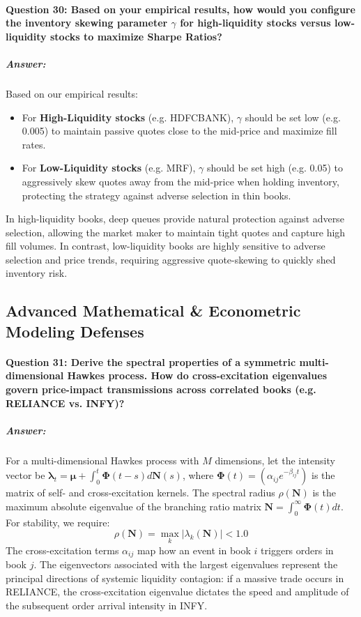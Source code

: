 \documentclass[11pt,a4paper]{article}
\begin{document}
\paragraph{Question 30: Based on your empirical results, how would you configure the inventory skewing parameter $\gamma$ for high-liquidity stocks versus low-liquidity stocks to maximize Sharpe Ratios?}
\subparagraph{Answer:}
Based on our empirical results:
\begin{itemize}
    \item For \textbf{High-Liquidity stocks} (e.g. HDFCBANK), $\gamma$ should be set low (e.g. 0.005) to maintain passive quotes close to the mid-price and maximize fill rates.
    \item For \textbf{Low-Liquidity stocks} (e.g. MRF), $\gamma$ should be set high (e.g. 0.05) to aggressively skew quotes away from the mid-price when holding inventory, protecting the strategy against adverse selection in thin books.
\end{itemize}

In high-liquidity books, deep queues provide natural protection against adverse selection, allowing the market maker to maintain tight quotes and capture high fill volumes. In contrast, low-liquidity books are highly sensitive to adverse selection and price trends, requiring aggressive quote-skewing to quickly shed inventory risk.

\subsection{Advanced Mathematical & Econometric Modeling Defenses}

\paragraph{Question 31: Derive the spectral properties of a symmetric multi-dimensional Hawkes process. How do cross-excitation eigenvalues govern price-impact transmissions across correlated books (e.g. RELIANCE vs. INFY)?}
\subparagraph{Answer:}
For a multi-dimensional Hawkes process with $M$ dimensions, let the intensity vector be $\boldsymbol{\lambda}_t = \boldsymbol{\mu} + \int_0^t \boldsymbol{\Phi}(t - s) d\mathbf{N}(s)$, where $\boldsymbol{\Phi}(t) = (\alpha_{ij} e^{-\beta_{ij} t})$ is the matrix of self- and cross-excitation kernels. The spectral radius $\rho(\mathbf{N})$ is the maximum absolute eigenvalue of the branching ratio matrix $\mathbf{N} = \int_0^\infty \boldsymbol{\Phi}(t) dt$. For stability, we require:
\begin{equation}
    \rho(\mathbf{N}) = \max_k | \lambda_k(\mathbf{N}) | < 1.0
\end{equation}
The cross-excitation terms $\alpha_{ij}$ map how an event in book $i$ triggers orders in book $j$. The eigenvectors associated with the largest eigenvalues represent the principal directions of systemic liquidity contagion: if a massive trade occurs in RELIANCE, the cross-excitation eigenvalue dictates the speed and amplitude of the subsequent order arrival intensity in INFY.
\end{document}
